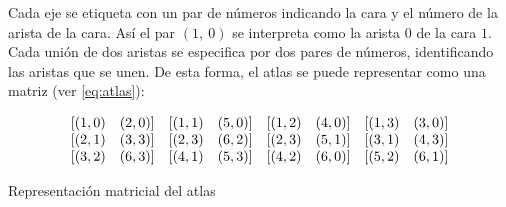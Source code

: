 Cada eje se etiqueta con un par de números indicando la cara y el número de la arista de la cara. Así el par $(1,\ 0)$ se interpreta como la arista $0$ de la cara $1$. Cada unión de dos aristas se especifica por dos pares de números, identificando las aristas que se unen. De esta forma, el atlas se puede representar como una matriz (ver \ref{eq:atlas}):


\begin{equation}
\begin{array}{c@{}c@{}c@{}c}
 \begin{array}{cc}
         [(1,0) & (2,0)]
  \end{array} & \begin{array}{cc}
         [(1,1) & (5,0)]
  \end{array} & \begin{array}{cc}
         [(1,2) & (4,0)]
  \end{array} &
  \begin{array}{cc}
         [(1,3) & (3,0)] 
  \end{array}
  \\
  \begin{array}{cc}
         [(2,1) & (3,3)]
  \end{array} & \begin{array}{cc}
         [(2,3) & (6,2)]
  \end{array} & \begin{array}{cc}
         [(2,3) & (5,1)] 
  \end{array} &
  \begin{array}{cc}
         [(3,1) & (4,3)]
  \end{array}
  \\
  \begin{array}{cc}
         [(3,2) & (6,3)]
  \end{array} & \begin{array}{cc}
         [(4,1) & (5,3)]
  \end{array} & \begin{array}{cc}
         [(4,2) & (6,0)] 
  \end{array} &
  \begin{array}{cc}
         [(5,2) & (6,1)] 
  \end{array}

\end{array}
\label{eq:atlas}
\end{equation}  

\begin{center}
\footnotesize{Representación matricial del atlas}
\end{center}

